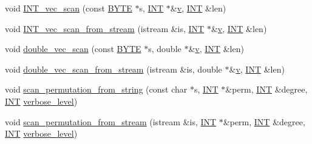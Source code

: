 \begin{DoxyCompactItemize}
\item 
void \mbox{\hyperlink{util_8_c_a9aa706d3f0c3bb83182eed9ab9747582}{I\+N\+T\+\_\+vec\+\_\+scan}} (const \mbox{\hyperlink{galois_8h_ab6cc7b4aeb6ea31aba2b3fbfc83ff5e6}{B\+Y\+TE}} $\ast$s, \mbox{\hyperlink{galois_8h_a09fddde158a3a20bd2dcadb609de11dc}{I\+NT}} $\ast$\&\mbox{\hyperlink{simeon_8_c_aeb3f3030944801b163bc3b829a7f6710}{v}}, \mbox{\hyperlink{galois_8h_a09fddde158a3a20bd2dcadb609de11dc}{I\+NT}} \&len)
\item 
void \mbox{\hyperlink{util_8_c_a7dc639ea3d5da900adb978c9322353a7}{I\+N\+T\+\_\+vec\+\_\+scan\+\_\+from\+\_\+stream}} (istream \&is, \mbox{\hyperlink{galois_8h_a09fddde158a3a20bd2dcadb609de11dc}{I\+NT}} $\ast$\&\mbox{\hyperlink{simeon_8_c_aeb3f3030944801b163bc3b829a7f6710}{v}}, \mbox{\hyperlink{galois_8h_a09fddde158a3a20bd2dcadb609de11dc}{I\+NT}} \&len)
\item 
void \mbox{\hyperlink{util_8_c_a31ec307236a2ca8190bcb8e9637b132b}{double\+\_\+vec\+\_\+scan}} (const \mbox{\hyperlink{galois_8h_ab6cc7b4aeb6ea31aba2b3fbfc83ff5e6}{B\+Y\+TE}} $\ast$s, double $\ast$\&\mbox{\hyperlink{simeon_8_c_aeb3f3030944801b163bc3b829a7f6710}{v}}, \mbox{\hyperlink{galois_8h_a09fddde158a3a20bd2dcadb609de11dc}{I\+NT}} \&len)
\item 
void \mbox{\hyperlink{util_8_c_a697ad822dac70e095d5f26906069880d}{double\+\_\+vec\+\_\+scan\+\_\+from\+\_\+stream}} (istream \&is, double $\ast$\&\mbox{\hyperlink{simeon_8_c_aeb3f3030944801b163bc3b829a7f6710}{v}}, \mbox{\hyperlink{galois_8h_a09fddde158a3a20bd2dcadb609de11dc}{I\+NT}} \&len)
\item 
void \mbox{\hyperlink{util_8_c_a93f8c29fa198eae428b44a2dd0eb51bd}{scan\+\_\+permutation\+\_\+from\+\_\+string}} (const char $\ast$s, \mbox{\hyperlink{galois_8h_a09fddde158a3a20bd2dcadb609de11dc}{I\+NT}} $\ast$\&perm, \mbox{\hyperlink{galois_8h_a09fddde158a3a20bd2dcadb609de11dc}{I\+NT}} \&degree, \mbox{\hyperlink{galois_8h_a09fddde158a3a20bd2dcadb609de11dc}{I\+NT}} \mbox{\hyperlink{simeon_8_c_a818073fbcc2f439e7c56952f67386122}{verbose\+\_\+level}})
\item 
void \mbox{\hyperlink{util_8_c_adf84ccaf0a1fda4496d2f60a33c53b88}{scan\+\_\+permutation\+\_\+from\+\_\+stream}} (istream \&is, \mbox{\hyperlink{galois_8h_a09fddde158a3a20bd2dcadb609de11dc}{I\+NT}} $\ast$\&perm, \mbox{\hyperlink{galois_8h_a09fddde158a3a20bd2dcadb609de11dc}{I\+NT}} \&degree, \mbox{\hyperlink{galois_8h_a09fddde158a3a20bd2dcadb609de11dc}{I\+NT}} \mbox{\hyperlink{simeon_8_c_a818073fbcc2f439e7c56952f67386122}{verbose\+\_\+level}})
\item 

\end{DoxyCompactItemize}
